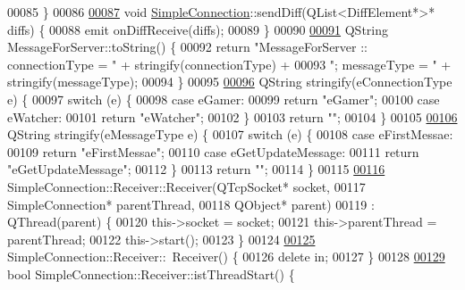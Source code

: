 \begin{DoxyCode}
00085 \}
00086 
\hyperlink{a00125_ab580ce17f2b9632414475a49dff64cce}{00087} \textcolor{keywordtype}{void} \hyperlink{a00125_a8360af71c89a54be93430b746d5fae08}{SimpleConnection}::sendDiff(QList<DiffElement*>* diffs) \{
00088   emit onDiffReceive(diffs);
00089 \}
00090 
\hyperlink{a00121_a9b98301583759754caf829cc1ed1520d}{00091} QString MessageForServer::toString() \{
00092   \textcolor{keywordflow}{return} \textcolor{stringliteral}{"MessageForServer :: connectionType = "} + stringify(connectionType) +
00093          \textcolor{stringliteral}{"; messageType = "} + stringify(messageType);
00094 \}
00095 
\hyperlink{a00008_aabd3ff178ce3faed55804cc56f78fc6a}{00096} QString stringify(eConnectionType e) \{
00097   \textcolor{keywordflow}{switch} (e) \{
00098     \textcolor{keywordflow}{case} eGamer:
00099       \textcolor{keywordflow}{return} \textcolor{stringliteral}{"eGamer"};
00100     \textcolor{keywordflow}{case} eWatcher:
00101       \textcolor{keywordflow}{return} \textcolor{stringliteral}{"eWatcher"};
00102   \}
00103   \textcolor{keywordflow}{return} \textcolor{stringliteral}{""};
00104 \}
00105 
\hyperlink{a00008_abb3e44449c2fd1fa9275c1d4273c66f9}{00106} QString stringify(eMessageType e) \{
00107   \textcolor{keywordflow}{switch} (e) \{
00108     \textcolor{keywordflow}{case} eFirstMessae:
00109       \textcolor{keywordflow}{return} \textcolor{stringliteral}{"eFirstMessae"};
00110     \textcolor{keywordflow}{case} eGetUpdateMessage:
00111       \textcolor{keywordflow}{return} \textcolor{stringliteral}{"eGetUpdateMessage"};
00112   \}
00113   \textcolor{keywordflow}{return} \textcolor{stringliteral}{""};
00114 \}
00115 
\hyperlink{a00133_a188daa54b2ed047298df6b889dad5004}{00116} SimpleConnection::Receiver::Receiver(QTcpSocket* socket,
00117                                      SimpleConnection* parentThread,
00118                                      QObject* parent)
00119     : QThread(parent) \{
00120   \textcolor{keyword}{this}->socket = socket;
00121   \textcolor{keyword}{this}->parentThread = parentThread;
00122   \textcolor{keyword}{this}->start();
00123 \}
00124 
\hyperlink{a00133_ad751c9c2c8152a039876b65197a6b512}{00125} SimpleConnection::Receiver::~Receiver() \{
00126   \textcolor{keyword}{delete} in;
00127 \}
00128 
\hyperlink{a00133_a7cd5d65acac04d9eaa59817f15ddae62}{00129} \textcolor{keywordtype}{bool} SimpleConnection::Receiver::istThreadStart() \{

\end{DoxyCode}
